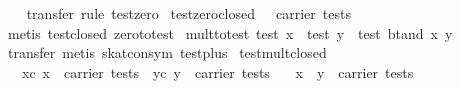 \begin{isabellebody}
%
\isadelimproof
\ \ %
\endisadelimproof
%
\isatagproof
{}\isamarkupfalse%
\ {}transfer{}\ rule\ test{}zero{}%
\endisatagproof
{\isafoldproof}%
%
\isadelimproof
\isanewline
%
\endisadelimproof
\isanewline
{}\isamarkupfalse%
\ test{}zero{}closed{}\ {}{}\ {}\ carrier\ tests{}\isanewline
%
\isadelimproof
\ \ %
\endisadelimproof
%
\isatagproof
{}\isamarkupfalse%
\ {}metis\ test{}closed\ zero{}to{}test{}%
\endisatagproof
{\isafoldproof}%
%
\isadelimproof
\isanewline
%
\endisadelimproof
\isanewline
{}\isamarkupfalse%
\ mult{}to{}test{}\ {}test\ x\ {}\ test\ y\ {}\ test\ {}bt{}and\ x\ y{}{}\isanewline
%
\isadelimproof
\ \ %
\endisadelimproof
%
\isatagproof
{}\isamarkupfalse%
\ {}transfer{}\ metis\ skat{}con{}sym\ test{}plus{}%
\endisatagproof
{\isafoldproof}%
%
\isadelimproof
\isanewline
%
\endisadelimproof
\isanewline
{}\isamarkupfalse%
\ test{}mult{}closed{}\isanewline
\ \ \ xc{}\ {}x\ {}\ carrier\ tests{}\ \ yc{}\ {}y\ {}\ carrier\ tests{}\isanewline
\ \ \ {}x\ {}\ y\ {}\ carrier\ tests{}\isanewline

\end{isabellebody}
